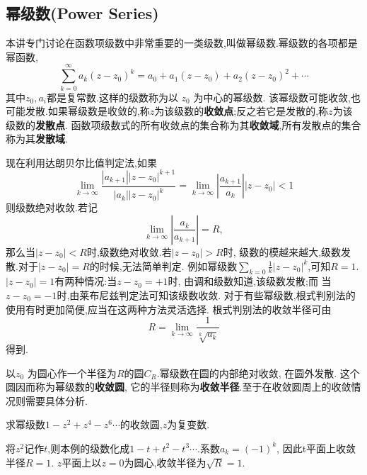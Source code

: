 \subsection{幂级数(Power Series)}
本讲专门讨论在函数项级数中非常重要的一类级数,叫做幂级数.幂级数的各项都是幂函数,
\begin{equation}
    \sum_{k=0}^{\infty} a_k\left(z-z_0\right)^k=a_0+a_1\left(z-z_0\right)+a_2\left(z-z_0\right)^2+\cdots
\end{equation}
其中$z_0, a_i$都是复常数.这样的级数称为以 $z_0$ 为中心的幂级数.
该幂级数可能收敛,也可能发散.如果幂级数是收敛的,称$z$为该级数的\textbf{收敛点};反之若它是发散的,称$z$为该级数的\textbf{发散点}.
函数项级数式的所有收敛点的集合称为其\textbf{收敛域},所有发散点的集合称为其\textbf{发散域}.

现在利用达朗贝尔比值判定法,如果
\begin{equation}
    \lim _{k \rightarrow \infty} \frac{\left|a_{k+1}\right|\left|z-z_0\right|^{k+1}}{\left|a_k\right|\left|z-z_0\right|^k}
    =\lim _{k \rightarrow \infty}\left|\frac{a_{k+1}}{a_k}\right|\left|z-z_0\right|<1
\end{equation}
则级数绝对收敛.若记
\begin{equation}
    \lim_{k \rightarrow \infty} \left|\frac{a_{k}}{a_{k+1}}\right| = R,
\end{equation}
那么当$|z-z_0| < R$时,级数绝对收敛.若$|z-z_0| > R$时, 级数的模越来越大,级数发散.对于$|z-z_0| = R$的时候,无法简单判定.
例如幂级数$\sum_{k=0} \frac{1}{k} |z-z_0|^k$,可知$R=1$.$|z-z_0|=1$有两种情况:当$z-z_0 = +1$时, 由调和级数知道,该级数发散;而
当$z-z_0 = -1$时,由莱布尼兹判定法可知该级数收敛.
对于有些幂级数,根式判别法的使用有时更加简便,应当在这两种方法灵活选择.
根式判别法的收敛半径可由
\begin{equation}
    R = \lim_{k \rightarrow \infty} \frac{1}{\sqrt[k]{a_k}}
\end{equation}
得到.

以$z_0$ 为圆心作一个半径为$R$的圆$C_R$.幂级数在圆的内部绝对收敛, 在圆外发散. 这个圆因而称为幂级数的\textbf{收敛圆}, 
它的半径则称为\textbf{收敛半径}.至于在收敛圆周上的收敛情况则需要具体分析.

\begin{example}
求幂级数$1 - z^2 + z^4 - z^6\cdots$的收敛圆,$z$为复变数.
\end{example}
\begin{solution}
    将$z^2$记作$t$,则本例的级数化成$1-t + t^2 - t^3\cdots$.系数$a_k =(-1)^k$, 因此t平面上收敛半径$R=1$. 
    $z$平面上以$z=0$为圆心,收敛半径为$\sqrt{R}=1$.
\end{solution}

